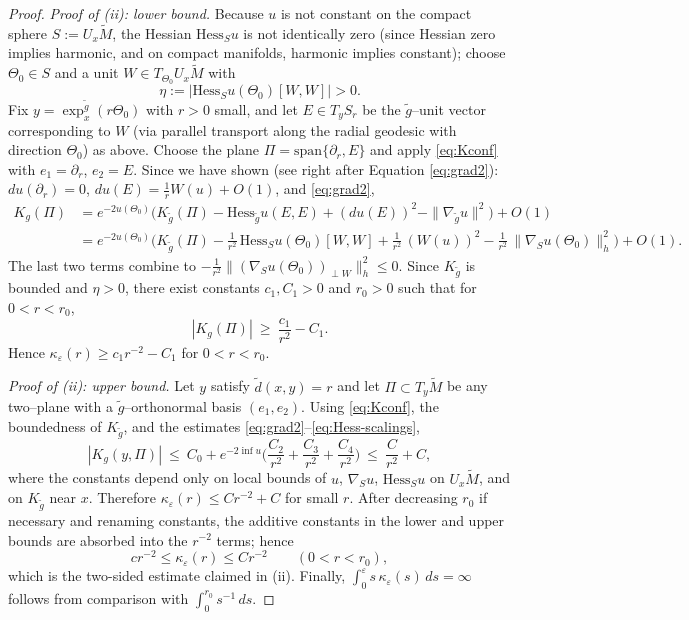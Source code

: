 \documentclass{amsart}
\theoremstyle{definition}
\theoremstyle{remark}
\newcommand{\0}{\boldsymbol{0}}
\begin{document}
\begin{proof}
\smallskip
\emph{Proof of (ii): lower bound.}
Because $u$ is not constant on the compact sphere $S:=U_x\widetilde M$, the Hessian $\mathrm{Hess}_S u$ is not identically zero (since Hessian zero implies harmonic, and on compact manifolds, harmonic implies constant); choose $\Theta_0\in S$ and a unit $W\in T_{\Theta_0}U_x\widetilde M$ with 
\[
\eta:=|\mathrm{Hess}_S u(\Theta_0)[W,W]|>0.
\]
Fix $y=\exp_x^{\tilde g}(r\Theta_0)$ with $r>0$ small, and let $E\in T_yS_r$ be the $\widetilde g$–unit vector corresponding to $W$ (via parallel transport along the radial geodesic with direction $\Theta_0$) as above. 
Choose the plane $\Pi=\mathrm{span}\{\partial_r,E\}$ and apply \eqref{eq:Kconf} with $e_1=\partial_r$, $e_2=E$. 
Since we have shown (see right after Equation \ref{eq:grad2}): $du(\partial_r)=0$, $du(E)=\frac1r W(u)+O(1)$, and \eqref{eq:grad2},
\[
\begin{aligned}
K_g(\Pi)&=e^{-2u(\Theta_0)}\Big(
K_{\widetilde g}(\Pi)
-\mathrm{Hess}_{\widetilde g}u(E,E) + (du(E))^2 - \|\nabla_{\widetilde g}u\|^2\Big)+O(1)\\
&=e^{-2u(\Theta_0)}\Big(
K_{\widetilde g}(\Pi)
-\frac{1}{r^2}\,\mathrm{Hess}_S u(\Theta_0)[W,W]
+\frac{1}{r^2}\,(W(u))^2
-\frac{1}{r^2}\,\|\nabla_S u(\Theta_0)\|_h^2
\Big)+O(1).
\end{aligned}
\]
The last two terms combine to $-\frac{1}{r^2}\|( \nabla_S u(\Theta_0))_{\perp W}\|_h^2\le0$. 
Since $K_{\widetilde g}$ is bounded and $\eta>0$, there exist constants $c_1,C_1>0$ and $r_0>0$ such that for $0<r<r_0$,
\[
|K_g(\Pi)|\ \ge\ \frac{c_1}{r^2}-C_1.
\]
Hence $\kappa_{\varepsilon}(r)\ge c_1 r^{-2}-C_1$ for $0<r<r_0$.

\smallskip
\emph{Proof of (ii): upper bound.}
Let $y$ satisfy $\widetilde d(x,y)=r$ and let $\Pi\subset T_y\widetilde M$ be any two–plane with a $\widetilde g$–orthonormal basis $(e_1,e_2)$. 
Using \eqref{eq:Kconf}, the boundedness of $K_{\widetilde g}$, and the estimates \eqref{eq:grad2}–\eqref{eq:Hess-scalings},
\[
|K_g(y,\Pi)|
\ \le\ C_0 
+ e^{-2\inf u}\Big(
\frac{C_2}{r^2} + \frac{C_3}{r^2} + \frac{C_4}{r^2}
\Big)
\ \le\ \frac{C}{r^2}+C,
\]
where the constants depend only on local bounds of $u$, $\nabla_S u$, $\mathrm{Hess}_S u$ on $U_x\widetilde M$, and on $K_{\widetilde g}$ near $x$. 
Therefore $\kappa_{\varepsilon}(r)\le C r^{-2}+C$ for small $r$. After decreasing $r_0$ if necessary and renaming constants, the additive constants in the lower and upper bounds are absorbed into the $r^{-2}$ terms; hence
\[
c r^{-2}\le \kappa_{\varepsilon}(r)\le C r^{-2}\qquad (0<r<r_0),
\]
which is the two-sided estimate claimed in (ii).
Finally, $\int_0^\varepsilon s\,\kappa_{\varepsilon}(s)\,ds=\infty$ follows from comparison with $\int_0^{r_0} s^{-1}\,ds$.


\end{proof}
\end{document}
